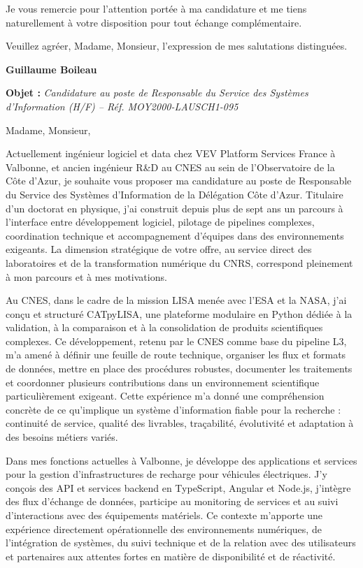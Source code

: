 \documentclass[10pt,a4paper]{altacv}
\begin{document}
Je vous remercie pour l’attention portée à ma candidature et me tiens naturellement à votre disposition pour tout échange complémentaire.

Veuillez agréer, Madame, Monsieur, l’expression de mes salutations distinguées.

\textbf{Guillaume Boileau}


\fi

{\color{accent}\textbf{Objet :}} \textit{Candidature au poste de Responsable du Service des Systèmes d'Information (H/F) -- Réf. MOY2000-LAUSCH1-095}

\vspace{0.4cm}

{\color{body}

Madame, Monsieur,

Actuellement ingénieur logiciel et data chez VEV Platform Services France à Valbonne, et ancien ingénieur R\&D au CNES au sein de l’Observatoire de la Côte d’Azur, je souhaite vous proposer ma candidature au poste de Responsable du Service des Systèmes d’Information de la Délégation Côte d’Azur. Titulaire d’un doctorat en physique, j’ai construit depuis plus de sept ans un parcours à l’interface entre développement logiciel, pilotage de pipelines complexes, coordination technique et accompagnement d’équipes dans des environnements exigeants. La dimension stratégique de votre offre, au service direct des laboratoires et de la transformation numérique du CNRS, correspond pleinement à mon parcours et à mes motivations.

Au CNES, dans le cadre de la mission LISA menée avec l’ESA et la NASA, j’ai conçu et structuré CATpyLISA, une plateforme modulaire en Python dédiée à la validation, à la comparaison et à la consolidation de produits scientifiques complexes. Ce développement, retenu par le CNES comme base du pipeline L3, m’a amené à définir une feuille de route technique, organiser les flux et formats de données, mettre en place des procédures robustes, documenter les traitements et coordonner plusieurs contributions dans un environnement scientifique particulièrement exigeant. Cette expérience m’a donné une compréhension concrète de ce qu’implique un système d’information fiable pour la recherche : continuité de service, qualité des livrables, traçabilité, évolutivité et adaptation à des besoins métiers variés.

Dans mes fonctions actuelles à Valbonne, je développe des applications et services pour la gestion d’infrastructures de recharge pour véhicules électriques. J’y conçois des API et services backend en TypeScript, Angular et Node.js, j’intègre des flux d’échange de données, participe au monitoring de services et au suivi d’interactions avec des équipements matériels. Ce contexte m’apporte une expérience directement opérationnelle des environnements numériques, de l’intégration de systèmes, du suivi technique et de la relation avec des utilisateurs et partenaires aux attentes fortes en matière de disponibilité et de réactivité.

}
\end{document}
